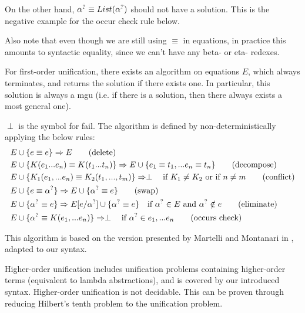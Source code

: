 \documentclass[twoside,12pt,a4paper]{article}
\begin{document}
On the other hand, $\alpha^?\equiv List(\alpha^?)$ should not have a solution. This is the negative example for the occur check rule below.

Also note that even though we are still using $\equiv$ in equations, in practice this amounts to syntactic equality, since we can't have any beta- or eta- redexes. 

\begin{theorem}
    For first-order unification, there exists an algorithm on equations $E$, which always terminates, and returns the solution if there exists one. 
    In particular, this solution is always a mgu (i.e. if there is a solution, then there always exists a most general one).
\end{theorem}

\begin{definition}
    $\perp$ is the symbol for fail.
    The algorithm is defined by non-deterministically applying the below rules:
    \begin{align*}
        E & \cup \{ e \equiv e\} \Rightarrow E \tag{delete}\\
        E & \cup \{K(e_1 ... e_n) \equiv K(t_1 ... t_n)\} \Rightarrow E \cup \{e_1 \equiv t_1, ... e_n \equiv t_n\}\tag{decompose}\\
        E & \cup \{K_1(e_1,...e_n) \equiv K_2(t_1, ..., t_m)\}  \Rightarrow \perp \quad\text{if $K_1 \neq K_2$ or if $n\neq m$} \tag{conflict}\\
        E & \cup \{e \equiv \alpha^?\} \Rightarrow E \cup \{\alpha^? \equiv e\}\tag{swap}\\ 
        E & \cup \{\alpha^? \equiv e\} \Rightarrow E[e/\alpha^?] \cup \{\alpha^? \equiv e\} \quad\text{if $\alpha^? \in E$ and $\alpha^? \notin e$}  \tag{eliminate}\\
        E & \cup \{\alpha^? \equiv K(e_1,...e_n)\}\Rightarrow \perp \quad \text{if $\alpha^? \in e_1,...e_n$} \tag{occurs check} 
    \end{align*}
\end{definition} 

This algorithm is based on the version presented by Martelli and Montanari in \cite{10.1145/357162.357169},
adapted to our syntax.


\begin{theorem}
    Higher-order unification includes unification problems containing higher-order terms (equivalent to lambda abstractions),
    and is covered by our introduced syntax. %
    Higher-order unification is not decidable. This can be proven through reducing Hilbert's tenth problem to the unification problem.
\end{theorem}
\end{document}
